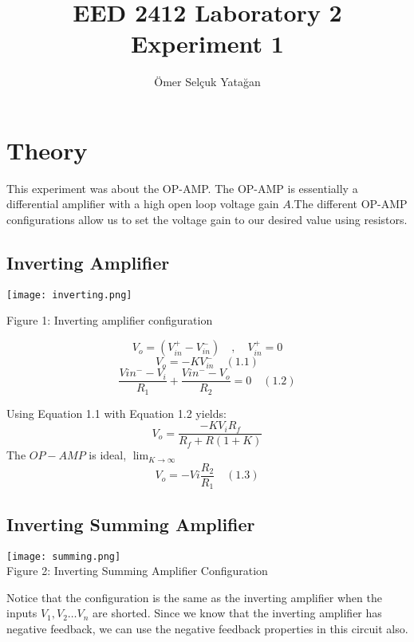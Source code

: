 \documentclass{article}
\title{EED 2412 Laboratory 2 \\ Experiment 1}
\author{Ömer Selçuk Yatağan}
\begin{document}
\maketitle


\section{Theory}

This experiment was about the OP-AMP. The OP-AMP is essentially a differential amplifier with a high open loop voltage gain $A$.The different OP-AMP configurations allow us to set the voltage gain to our desired value using resistors.
\subsection{Inverting Amplifier}

\begin{center}
\texttt{[image: inverting.png]}
\end{center}

\begin{center}
Figure 1: Inverting amplifier configuration

\[V_o = (V_{in}^+ - V_{in}^-)\quad, \quad V_{in}^+ = 0\] 
\[V_o = - KV_{in}^-  \quad(1.1)\] \[\frac{V{in}^- - V_i}{R_1} + \frac{V{in}^- - V_o}{R_2} = 0 \quad(1.2)\]
\end{center}

Using Equation 1.1 with Equation 1.2 yields:
\[V_{o} = \frac{-KV_iR_f}{R_f+R(1+K)}\]
\quad The $OP-AMP$ is ideal, $\lim_{K\to\infty}$ 
\[V_o = -Vi\frac{R_2}{R_1} \quad (1.3)\] 





\subsection{Inverting Summing Amplifier}

\begin{center}
\texttt{[image: summing.png]}  \\
Figure 2: Inverting Summing Amplifier Configuration \\
\end{center}

Notice that the configuration is the same as the inverting amplifier when the inputs $V_1, V_2\dots V_n$ are shorted. Since we know that the inverting amplifier has negative feedback, we can use the negative feedback properties in this circuit also.
\end{document}
